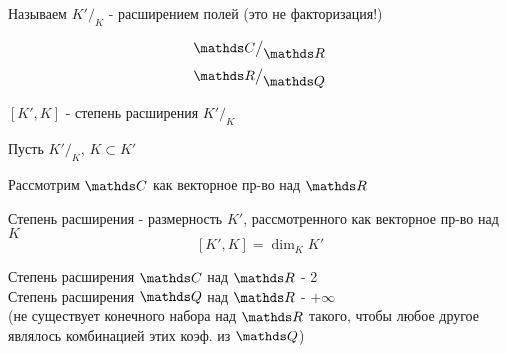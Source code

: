 \documentclass[main.tex]{subfiles}
\begin{document}
\begin{Proof}
\begin{definition}
          Называем $K'\big/_{\displaystyle K}$ - расширением полей (это не факторизация!)
      \end{definition}

      \begin{Example}
          \[\CC\big/_{\displaystyle \R}\]
          \[\R\big/_{\displaystyle \Q}\]
      \end{Example}

      \begin{definition}
          $[K', K]$ - степень расширения $K'\big/_{\displaystyle K}$
      \end{definition}

      Пусть $K'\big/_{\displaystyle K}$, $K \subset K'$

      Рассмотрим $\CC$ как векторное пр-во над $\R$

      \begin{remark}
          Степень расширения - размерность $K'$, рассмотренного как векторное пр-во над $K$
          \[[K',K] = \dim_K K'\]
      \end{remark}

      \begin{example}
          Степень расширения $\CC$ над $\R$ - 2\\
          Степень расширения $\Q$ над $\R$ - $+\infty$ \\
          (не существует конечного набора над $\R$
          такого, чтобы любое другое являлось комбинацией этих коэф. из $\Q$)
      \end{example}
    \end{Proof}
\end{document}
